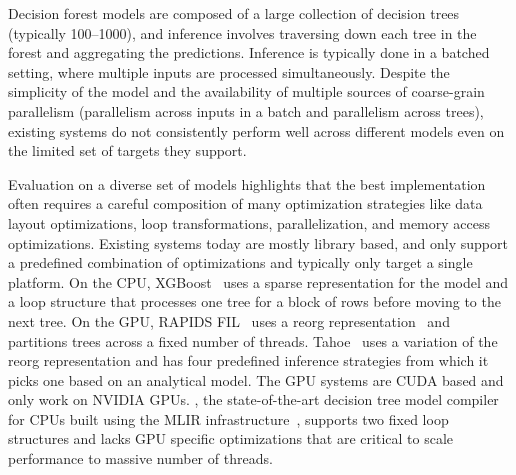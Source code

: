 Decision forest models are composed of a large collection of decision trees (typically 100--1000), and inference involves 
traversing down each tree in the forest and aggregating the predictions. Inference is typically done in a batched
setting, where multiple inputs are processed simultaneously.
Despite the simplicity of the model and the availability of multiple sources of coarse-grain parallelism (parallelism 
across inputs in a batch and parallelism across trees), existing systems do not consistently perform well across different
models even on the limited set of targets they support. 

Evaluation on a diverse set of models highlights that the best implementation often requires a careful composition 
of many optimization strategies like data layout optimizations, 
loop transformations, parallelization, and memory access optimizations. 
Existing systems today are mostly library based, and only support a predefined combination of optimizations
and typically only target a single platform. 
On the CPU, XGBoost~\cite{XGBoost} uses a sparse representation for the model 
and a loop structure that processes one tree for a block of rows before moving to 
the next tree. On the GPU, RAPIDS FIL~\cite{FIL} uses a reorg representation~\cite{FIL}
and partitions trees across a fixed number of threads. 
Tahoe~\cite{Tahoe} uses a variation of the reorg representation and 
has four predefined inference strategies from which it picks one based on an analytical model.
The GPU systems are CUDA based and only work on NVIDIA GPUs.
\TreebeardOLD{}, the state-of-the-art decision tree model compiler for CPUs 
built using the MLIR infrastructure~\cite{MLIR}, supports two fixed loop structures 
and lacks GPU specific optimizations that are critical to scale performance to massive number of threads.

